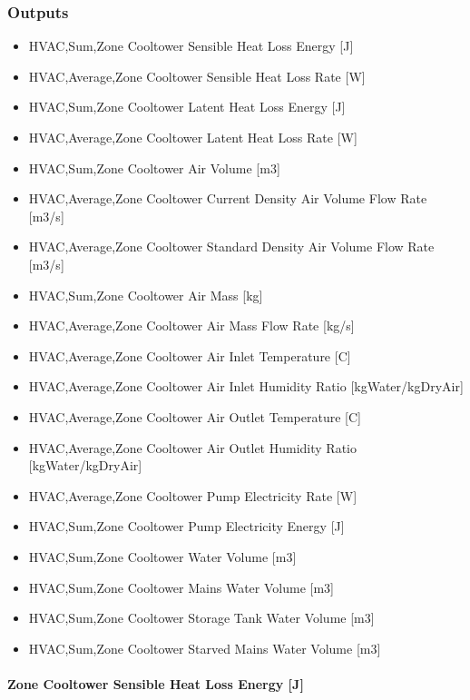 \subsubsection{Outputs}\label{outputs-6-000}

\begin{itemize}
\item
  HVAC,Sum,Zone Cooltower Sensible Heat Loss Energy {[}J{]}
\item
  HVAC,Average,Zone Cooltower Sensible Heat Loss Rate {[}W{]}
\item
  HVAC,Sum,Zone Cooltower Latent Heat Loss Energy {[}J{]}
\item
  HVAC,Average,Zone Cooltower Latent Heat Loss Rate {[}W{]}
\item
  HVAC,Sum,Zone Cooltower Air Volume {[}m3{]}
\item
  HVAC,Average,Zone Cooltower Current Density Air Volume Flow Rate {[}m3/s{]}
\item
  HVAC,Average,Zone Cooltower Standard Density Air Volume Flow Rate {[}m3/s{]}
\item
  HVAC,Sum,Zone Cooltower Air Mass {[}kg{]}
\item
  HVAC,Average,Zone Cooltower Air Mass Flow Rate {[}kg/s{]}
\item
  HVAC,Average,Zone Cooltower Air Inlet Temperature {[}C{]}
\item
  HVAC,Average,Zone Cooltower Air Inlet Humidity Ratio {[}kgWater/kgDryAir{]}
\item
  HVAC,Average,Zone Cooltower Air Outlet Temperature {[}C{]}
\item
  HVAC,Average,Zone Cooltower Air Outlet Humidity Ratio {[}kgWater/kgDryAir{]}
\item
  HVAC,Average,Zone Cooltower Pump Electricity Rate {[}W{]}
\item
  HVAC,Sum,Zone Cooltower Pump Electricity Energy {[}J{]}
\item
  HVAC,Sum,Zone Cooltower Water Volume {[}m3{]}
\item
  HVAC,Sum,Zone Cooltower Mains Water Volume {[}m3{]}
\item
  HVAC,Sum,Zone Cooltower Storage Tank Water Volume {[}m3{]}
\item
  HVAC,Sum,Zone Cooltower Starved Mains Water Volume {[}m3{]}
\end{itemize}

\paragraph{Zone Cooltower Sensible Heat Loss Energy {[}J{]}}\label{zone-cooltower-sensible-heat-loss-energy-j}

